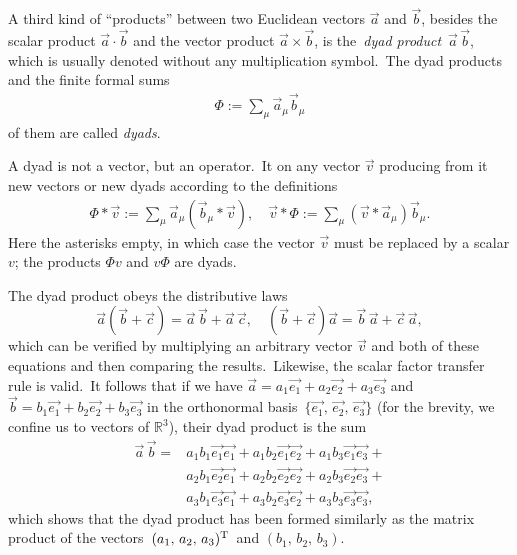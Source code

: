 \documentclass[12pt]{article}
\theoremstyle{definition}
\begin{document}
A third kind of  ``products'' between two Euclidean vectors $\vec{a}$ and $\vec{b}$, besides the scalar product $\vec{a}\!\cdot\!\vec{b}$ and the vector product $\vec{a}\!\times\!\vec{b}$, is the\, {\em dyad product}\, $\vec{a}\,\vec{b}$,\, which is usually denoted without any multiplication symbol.\, The dyad products and the finite formal sums 
\begin{align}
\Phi := \sum_\mu \vec{a}_\mu \vec{b}_\mu
\end{align}
of them are called {\em dyads}.

A dyad is not a vector, but an operator.\, It  on any vector $\vec{v}$ producing from it new vectors or new dyads according to the definitions
\begin{align}
\Phi*\vec{v} := \sum_\mu \vec{a}_\mu(\vec{b}_\mu*\vec{v}), \quad  
\vec{v}*\Phi := \sum_\mu (\vec{v}*\vec{a}_\mu)\vec{b}_\mu.
\end{align}
Here the asterisks  empty, in which case the vector $\vec{v}$ must be replaced by a scalar $v$; the products $\Phi v$ and $v\Phi$ are dyads.

The dyad product obeys the distributive laws
$$\vec{a}(\vec{b}\!+\!\vec{c}) = \vec{a}\,\vec{b}\!+\!\vec{a}\,\vec{c}, \quad
(\vec{b}\!+\!\vec{c})\vec{a} = \vec{b}\,\vec{a}\!+\!\vec{c}\,\vec{a},$$
which can be verified by multiplying an arbitrary vector $\vec{v}$ and both  of these equations and then comparing the results.\, Likewise, the scalar factor transfer rule is valid.\, It follows that if we have\; 
$\vec{a} = a_1\vec{e_1}+a_2\vec{e_2}+a_3\vec{e_3}$\; and\; 
$\vec{b} = b_1\vec{e_1}+b_2\vec{e_2}+b_3\vec{e_3}$\; in the orthonormal basis\, $\{\vec{e_1},\,\vec{e_2},\,\vec{e_3}\}$ (for the brevity, we confine us to vectors of $\mathbb{R}^3$), their dyad product is the sum    
\begin{eqnarray*}
\vec{a}\,\vec{b} =
&a_1b_1\vec{e_1}\vec{e_1}+a_1b_2\vec{e_1}\vec{e_2}+a_1b_3\vec{e_1}\vec{e_3}+\\
&a_2b_1\vec{e_2}\vec{e_1}+a_2b_2\vec{e_2}\vec{e_2}+a_2b_3\vec{e_2}\vec{e_3}+\\
&a_3b_1\vec{e_3}\vec{e_1}+a_3b_2\vec{e_3}\vec{e_2}+a_3b_3\vec{e_3}\vec{e_3},\;\;
\end{eqnarray*}
which shows that the dyad product has been formed similarly as the matrix product of the vectors\, $(a_1,\,a_2,\,a_3)^{\mbox{\scriptsize{T}}}$\, and $(b_1,\,b_2,\,b_3)$.
\end{document}
